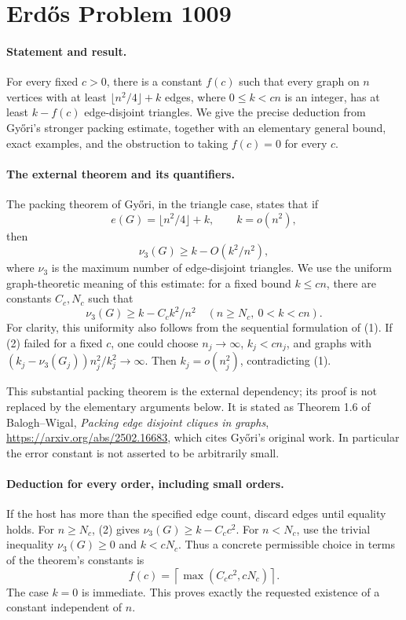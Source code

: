 \section*{Erd\H{o}s Problem 1009}

\paragraph{Statement and result.}
For every fixed \(c>0\), there is a constant \(f(c)\) such that every graph on \(n\) vertices with at least \(\lfloor n^2/4\rfloor+k\) edges, where \(0\leq k<cn\) is an integer, has at least \(k-f(c)\) edge-disjoint triangles. We give the precise deduction from Gy\H{o}ri's stronger packing estimate, together with an elementary general bound, exact examples, and the obstruction to taking \(f(c)=0\) for every \(c\).

\paragraph{The external theorem and its quantifiers.}
The packing theorem of Gy\H{o}ri, in the triangle case, states that if
\[
 e(G)=\lfloor n^2/4\rfloor+k,\qquad k=o(n^2),
\]
then
\[
 \nu_3(G)\geq k-O(k^2/n^2),
\tag{1}
\]
where \(\nu_3\) is the maximum number of edge-disjoint triangles. We use the uniform graph-theoretic meaning of this estimate: for a fixed bound \(k\leq cn\), there are constants \(C_c,N_c\) such that
\[
 \nu_3(G)\geq k-C_c k^2/n^2
 \quad(n\geq N_c,\ 0<k<cn).
\tag{2}
\]
For clarity, this uniformity also follows from the sequential formulation of (1). If (2) failed for a fixed \(c\), one could choose \(n_j\to\infty\), \(k_j<cn_j\), and graphs with
\((k_j-\nu_3(G_j))n_j^2/k_j^2\to\infty\). Then \(k_j=o(n_j^2)\), contradicting (1).

This substantial packing theorem is the external dependency; its proof is not replaced by the elementary arguments below. It is stated as Theorem 1.6 of Balogh--Wigal, \emph{Packing edge disjoint cliques in graphs}, \url{https://arxiv.org/abs/2502.16683}, which cites Gy\H{o}ri's original work. In particular the error constant is not asserted to be arbitrarily small.

\paragraph{Deduction for every order, including small orders.}
If the host has more than the specified edge count, discard edges until equality holds. For \(n\geq N_c\), (2) gives \(\nu_3(G)\geq k-C_c c^2\). For \(n<N_c\), use the trivial inequality \(\nu_3(G)\geq0\) and \(k<cN_c\). Thus a concrete permissible choice in terms of the theorem's constants is
\[
 f(c)=\left\lceil\max(C_c c^2,cN_c)\right\rceil.
\]
The case \(k=0\) is immediate. This proves exactly the requested existence of a constant independent of \(n\).

